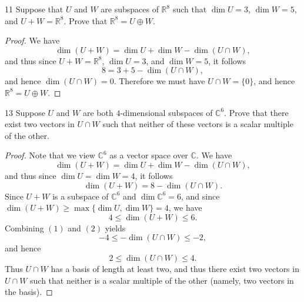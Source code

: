 \documentclass{extarticle}
\newenvironment{problem}[1]{\begin{prob*}{#1}{}}{\end{prob*}}
\newcommand{\R}{\mathbb{R}}
\newcommand{\C}{\mathbb{C}}
\begin{document}
\begin{problem}{11}
Suppose that $U$ and $W$ are subspaces of $\R^8$ such that $\dim U = 3$, $\dim W = 5$, and $U+W=\R^8$.  Prove that $\R^8=U\oplus W$.  
\end{problem}
\begin{proof}
We have
\begin{equation*}
\dim(U + W) = \dim U + \dim W - \dim(U\cap W),
\end{equation*}
and thus since $U + W =\R^8$, $\dim U = 3$, and $\dim W = 5$, it follows
\begin{equation*}
8 = 3 + 5 - \dim(U\cap W),
\end{equation*}
and hence $\dim(U\cap W) = 0$.  Therefore we must have $U\cap W = \{0\}$, and hence $\R^8=U\oplus W$.
\end{proof}

\begin{problem}{13}
Suppose $U$ and $W$ are both $4$-dimensional subspaces of $\C^6$.  Prove that there exist two vectors in $U\cap W$ such that neither of these vectors is a scalar multiple of the other.
\end{problem}
\begin{proof}
Note that we view $\C^6$ as a vector space over $\C$.  We have
\begin{equation*}
\dim(U + W) = \dim U + \dim W - \dim(U\cap W),
\end{equation*}
and thus since $\dim U = \dim W = 4$, it follows
\begin{equation}
\dim(U+W) = 8  - \dim(U \cap W).
\end{equation}
Since $U+W$ is a subspace of $\C^6$ and $\dim \C^6 = 6$, and since $\dim(U+W)\geq \max\{\dim U, \dim W\} = 4$, we have
\begin{equation}
4\leq \dim(U + W)\leq 6.
\end{equation}
Combining $(1)$ and $(2)$ yields
\begin{equation*}
-4 \leq -\dim(U\cap W) \leq -2,
\end{equation*}
and hence 
\begin{equation*}
2 \leq \dim(U\cap W)\leq 4.
\end{equation*}
Thus $U\cap W$ has a basis of length at least two, and thus there exist two vectors in $U\cap W$ such that neither is a scalar multiple of the other (namely, two vectors in the basis).
\end{proof}
\end{document}
